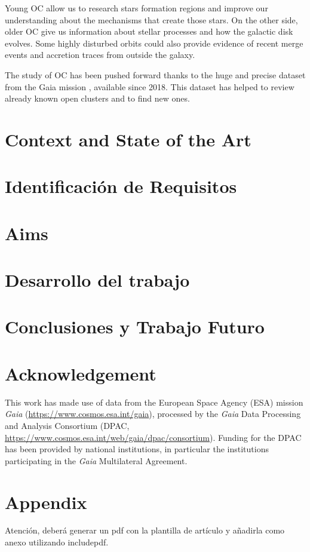 \documentclass[11pt, a4paper, english]{book}
\begin{document}
Young OC allow us to research stars formation regions and improve our understanding about the mechanisms that create those stars.
On the other side, older OC give us information about stellar processes and how the galactic disk evolves.
Some highly disturbed orbits could also provide evidence of recent merge events and accretion traces from outside the galaxy.
\cite[Cantat-Gaudin et al. 2016]{cantat2016abundances}

The study of OC has been pushed forward thanks to the huge and precise dataset from the Gaia mission \cite[Gaia DR2]{gaia2018gaia},
available since 2018. This dataset has helped to review already known open clusters and to find new ones.

\chapter{Context and State of the Art}

\chapter{Identificación de Requisitos}

\chapter{Aims}

\chapter{Desarrollo del trabajo}

\chapter{Conclusiones y Trabajo Futuro}

\chapter*{Acknowledgement}

This work has made use of data from the European Space Agency (ESA) mission
{\it Gaia} (\url{https://www.cosmos.esa.int/gaia}), processed by the {\it Gaia}
Data Processing and Analysis Consortium (DPAC,
\url{https://www.cosmos.esa.int/web/gaia/dpac/consortium}). Funding for the DPAC
has been provided by national institutions, in particular the institutions
participating in the {\it Gaia} Multilateral Agreement.




\appendix
\chapter{Appendix}
Atención, deberá generar un pdf con la plantilla de artículo y añadirla como anexo utilizando includepdf.

\end{document}
